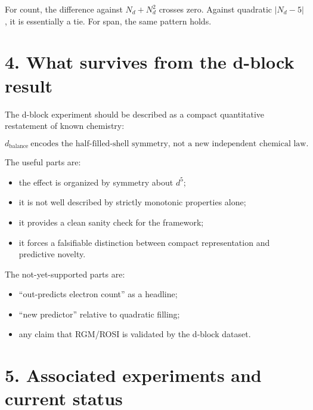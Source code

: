 For count, the difference against \(N_d+N_d^2\) crosses zero. Against
quadratic \(|N_d-5|\), it is essentially a tie. For span, the same
pattern holds.

\section{4. What survives from the d-block
result}\label{what-survives-from-the-d-block-result}

The d-block experiment should be described as a compact quantitative
restatement of known chemistry:

\[
\boxed{d_{\mathrm{balance}}\ \text{encodes the half-filled-shell symmetry, not a new independent chemical law.}}
\]

The useful parts are:

\begin{itemize}
\tightlist
\item
  the effect is organized by symmetry about \(d^5\);
\item
  it is not well described by strictly monotonic properties alone;
\item
  it provides a clean sanity check for the framework;
\item
  it forces a falsifiable distinction between compact representation and
  predictive novelty.
\end{itemize}

The not-yet-supported parts are:

\begin{itemize}
\tightlist
\item
  ``out-predicts electron count'' as a headline;
\item
  ``new predictor'' relative to quadratic filling;
\item
  any claim that RGM/ROSI is validated by the d-block dataset.
\end{itemize}

\section{5. Associated experiments and current
status}\label{associated-experiments-and-current-status}

